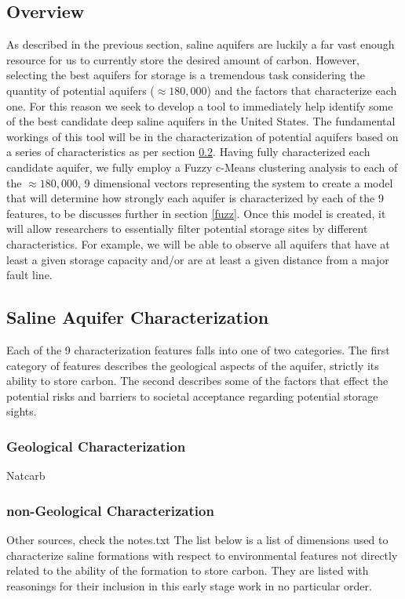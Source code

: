 \documentclass[a4paper, 12pt]{article}
\begin{document}
\subsection{Overview}
As described in the previous section, saline aquifers are luckily a far vast enough resource for us to currently store the desired amount of carbon. However, selecting the best aquifers for storage is a tremendous task considering the quantity of potential aquifers ($\approx180,000$) and the factors that characterize each one. For this reason we seek to develop a tool to immediately help identify some of the best candidate deep saline aquifers in the United States. 
The fundamental workings of this tool will be in the characterization of potential aquifers based on a series of characteristics as per section \ref{wellchar}. Having fully characterized each candidate aquifer, we fully employ a Fuzzy c-Means clustering analysis to each of the $\approx180,000$, 9 dimensional vectors representing the system to create a model that will determine how strongly each aquifer is characterized by each of the 9 features, to be discusses further in section \ref{fuzz}. Once this model is created, it will allow researchers to essentially filter potential storage sites by different characteristics. For example, we will be able to observe all aquifers that have at least a given storage capacity and/or are at least a given distance from a major fault line.  

\subsection{Saline Aquifer Characterization} \label{wellchar}
Each of the 9 characterization features falls into one of two categories. The first category of features describes the geological aspects of the aquifer, strictly its ability to store carbon. The second describes some of the factors that effect the potential risks and barriers to societal acceptance regarding potential storage sights. 

\subsubsection{Geological Characterization}
Natcarb

\subsubsection{non-Geological Characterization}
Other sources, check the notes.txt
The list below is a list of dimensions used to characterize saline formations with respect to environmental features not directly related to the ability of the formation to store carbon.
They are listed with reasonings for their inclusion in this early stage work in no particular order. 
\end{document}
